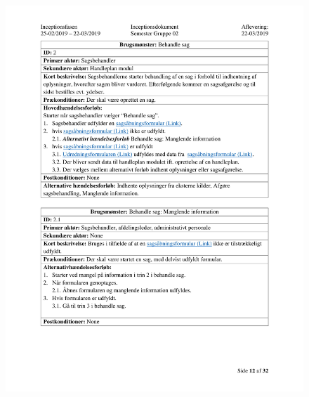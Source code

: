 \begin{figure}[hb]
  \includegraphics[scale = 0.33]{./PNG/Inceptions/Gruppe02+InceptionsDokument-13.jpg} 
\end{figure}

